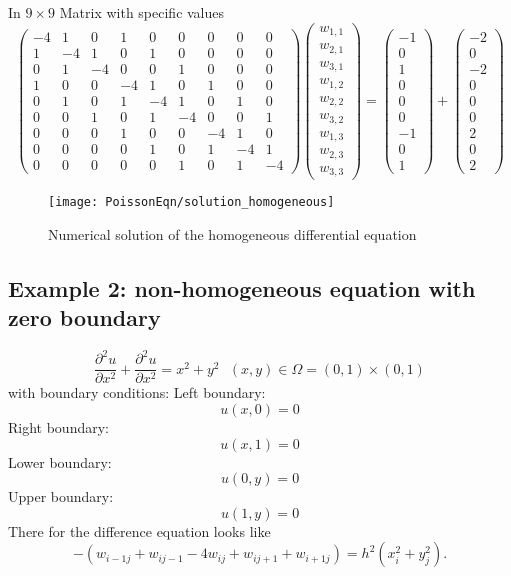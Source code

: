 In $9\times 9$ Matrix with specific values
\[\left(\begin{array}{ccccccccc}
-4& 1 & 0 &1 &0 &0 &0 &0 &0\\
1&-4& 1 & 0 &1 &0 &0 &0 &0 \\
0 &1&-4&  0&0 &1 &0 &0 &0 \\
1 &0 &0 &-4& 1 & 0 &1 &0 &0\\
0 & 1 &0 &1&-4& 1 &0 &1 &0  \\
0 &0 &1 &0 &1&-4&0&  0 &1  \\
0&0&0&1 &0 &0 &-4& 1 & 0\\
0&0&0&0 & 1 &0 &1&-4& 1   \\
0&0&0&0 &0 &1 &0 &1&-4
\end{array}\right)
\left(\begin{array}{c}
w_{1,1}\\
w_{2,1}\\
w_{3,1}\\
w_{1,2}\\
w_{2,2}\\
w_{3,2}\\
w_{1,3}\\
w_{2,3}\\
w_{3,3}
\end{array}\right)=
\left(\begin{array}{c}
-1\\
0\\
1\\
0\\
0\\
0\\
-1\\
0\\
1
\end{array}\right)
+\left(\begin{array}{c}
-2\\
0\\
-2\\
0\\
0\\
0\\
2\\
0\\
2
\end{array}\right)
\]	

\begin{figure}[H]
  \caption{Numerical solution of the homogeneous differential equation }
  \centering
    \texttt{[image: PoissonEqn/solution\_homogeneous]}
\end{figure}

\subsection{Example 2: non-homogeneous equation with zero boundary}
\[ \frac{\partial^2 u}{\partial x^2}+\frac{\partial^2 u}{\partial x^2}=x^2+y^2 \ \ \ (x,y) \in \Omega=(0,1)\times (0,1) \]
with boundary conditions:
Left boundary:
\[u(x,0) =0 \]
Right boundary:
\[u(x,1) = 0  \]
Lower boundary:
\[u(0,y) = 0 \]
Upper boundary:
\[u(1,y) =  0 \]
There for the difference equation looks like
\[-(w_{i-1j}+w_{ij-1}-4w_{ij}+w_{ij+1}+w_{i+1j})=h^2(x_i^2+y_j^2). \]

